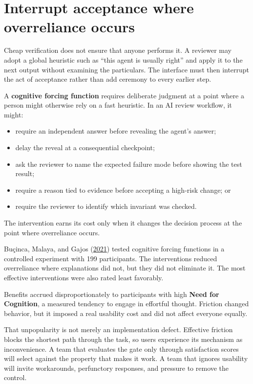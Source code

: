 \hypertarget{interrupt-acceptance-where-overreliance-occurs}{%
\section{Interrupt acceptance where overreliance occurs}\label{interrupt-acceptance-where-overreliance-occurs}}

Cheap verification does not ensure that anyone performs it. A reviewer may adopt a global heuristic such as ``this agent is usually right'' and apply it to the next output without examining the particulars. The interface must then interrupt the act of acceptance rather than add ceremony to every earlier step.


A \textbf{cognitive forcing function} requires deliberate judgment at a point where a person might otherwise rely on a fast heuristic. In an AI review workflow, it might:

\begin{itemize}
\tightlist
\item
  require an independent answer before revealing the agent's answer;
\item
  delay the reveal at a consequential checkpoint;
\item
  ask the reviewer to name the expected failure mode before showing the test result;
\item
  require a reason tied to evidence before accepting a high-risk change; or
\item
  require the reviewer to identify which invariant was checked.
\end{itemize}

The intervention earns its cost only when it changes the decision process at the point where overreliance occurs.

Buçinca, Malaya, and Gajos (\href{https://arxiv.org/abs/2102.09692}{2021}) tested cognitive forcing functions in a controlled experiment with 199 participants. The interventions reduced overreliance where explanations did not, but they did not eliminate it. The most effective interventions were also rated least favorably.

Benefits accrued disproportionately to participants with high \textbf{Need for Cognition}, a measured tendency to engage in effortful thought. Friction changed behavior, but it imposed a real usability cost and did not affect everyone equally.

That unpopularity is not merely an implementation defect. Effective friction blocks the shortest path through the task, so users experience its mechanism as inconvenience. A team that evaluates the gate only through satisfaction scores will select against the property that makes it work. A team that ignores usability will invite workarounds, perfunctory responses, and pressure to remove the control.

